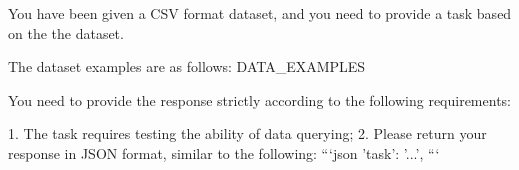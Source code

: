 \begin{tcolorbox}[colback=cadmiumgreen!5!white,colframe=forestgreen!75!white,breakable,title=\textit{Prompt for task construction in data querying.}]
\begin{VerbatimWrap}
You have been given a CSV format dataset, and you need to provide a task based on the the dataset.
    
The dataset examples are as follows:
{{DATA_EXAMPLES}}

You need to provide the response strictly according to the following requirements:

1. The task requires testing the ability of data querying;
2. Please return your response in JSON format, similar to the following:
```json
{
    'task': '...',
}
```
\end{VerbatimWrap}
\end{tcolorbox}
